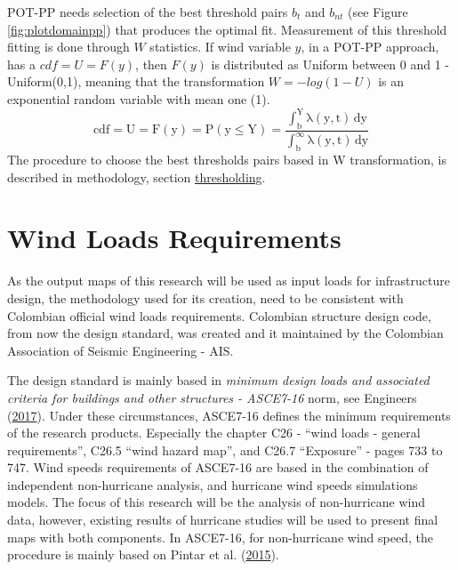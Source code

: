 \documentclass[12pt,oneside]{reedthesis}
\begin{document}
POT-PP needs selection of the best threshold pairs \(b_t\) and \(b_{nt}\) (see Figure \ref{fig:plotdomainpp}) that produces the optimal fit. Measurement of this threshold fitting is done through \(W\) statistics. If wind variable \(y\), in a POT-PP approach, has a \(cdf = U = F(y)\), then \(F(y)\) is distributed as Uniform between 0 and 1 - Uniform(0,1), meaning that the transformation \(W = -log(1-U)\) is an exponential random variable with mean one (1).
\begin{equation}
  \mathrm{
            cdf = U= F(y) = P(y \leq Y) = \frac{\int_b^Y\lambda(y,t)\,dy}{\int_b^\infty\lambda(y,t)\,dy} 
         }
  \label{eq:ppcdf}
\end{equation}
The procedure to choose the best thresholds pairs based in W transformation, is described in methodology, section \protect\hyperlink{thresholding}{thresholding}.

\hypertarget{windloadsrequirements}{%
\section{Wind Loads Requirements}\label{windloadsrequirements}}

As the output maps of this research will be used as input loads for infrastructure design, the methodology used for its creation, need to be consistent with Colombian official wind loads requirements. Colombian structure design code, from now the design standard, was created and it maintained by the Colombian Association of Seismic Engineering - AIS.

The design standard is mainly based in \emph{minimum design loads and associated criteria for buildings and other structures - ASCE7-16} norm, see Engineers (\protect\hyperlink{ref-Asce2017}{2017}). Under these circumstances, ASCE7-16 defines the minimum requirements of the research products. Especially the chapter C26 - ``wind loads - general requirements'', C26.5 ``wind hazard map'', and C26.7 ``Exposure'' - pages 733 to 747. Wind speeds requirements of ASCE7-16 are based in the combination of independent non-hurricane analysis, and hurricane wind speeds simulations models. The focus of this research will be the analysis of non-hurricane wind data, however, existing results of hurricane studies will be used to present final maps with both components. In ASCE7-16, for non-hurricane wind speed, the procedure is mainly based on Pintar et al. (\protect\hyperlink{ref-Pintar2015}{2015}).
\end{document}
